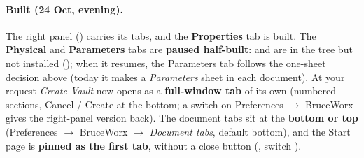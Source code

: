 \paragraph{Built (24 Oct, evening).} The right panel () carries its tabs, and the
\textbf{Properties} tab is built. The \textbf{Physical} and \textbf{Parameters} tabs are \textbf{paused half-built}:
 and  are in the tree but not installed
(); when it resumes, the Parameters tab follows the one-sheet decision above (today it
makes a \emph{Parameters} sheet in each document). At your request \emph{Create Vault} now opens as a
\textbf{full-window tab} of its own (numbered sections, Cancel / Create at the bottom; a switch on Preferences
$\rightarrow$ BruceWorx gives the right-panel version back). The document tabs sit at the \textbf{bottom or top}
(Preferences $\rightarrow$ BruceWorx $\rightarrow$ \emph{Document tabs}, default bottom), and the Start page is
\textbf{pinned as the first tab}, without a close button (, switch ).

